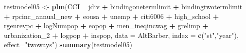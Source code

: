 \documentclass[]{article}
\newenvironment{Shaded}{\begin{snugshade}}{\end{snugshade}}
\newcommand{\KeywordTok}[1]{\textcolor[rgb]{0.13,0.29,0.53}{\textbf{#1}}}
\newcommand{\DataTypeTok}[1]{\textcolor[rgb]{0.13,0.29,0.53}{#1}}
\newcommand{\DecValTok}[1]{\textcolor[rgb]{0.00,0.00,0.81}{#1}}
\newcommand{\StringTok}[1]{\textcolor[rgb]{0.31,0.60,0.02}{#1}}
\newcommand{\OperatorTok}[1]{\textcolor[rgb]{0.81,0.36,0.00}{\textbf{#1}}}
\newcommand{\NormalTok}[1]{#1}
\begin{document}
\begin{Shaded}
\begin{Highlighting}[]
\NormalTok{testmodel05 <-}\StringTok{ }\KeywordTok{plm}\NormalTok{(CCI }\OperatorTok{~}\StringTok{ }\NormalTok{jdiv }\OperatorTok{+}\StringTok{ }\NormalTok{bindingonetermlimit }\OperatorTok{+}\StringTok{ }\NormalTok{bindingtwotermlimit }\OperatorTok{+}\StringTok{ }\NormalTok{rpcinc_annual_new }\OperatorTok{+}\StringTok{ }\NormalTok{eousa }\OperatorTok{+}\StringTok{ }\NormalTok{unemp }\OperatorTok{+}\StringTok{ }\NormalTok{citi6006 }\OperatorTok{+}\StringTok{ }\NormalTok{high_school }\OperatorTok{+}\StringTok{ }\NormalTok{rgenrevpc }\OperatorTok{+}\StringTok{ }\NormalTok{logNumpop }\OperatorTok{+}\StringTok{ }\NormalTok{eopop }\OperatorTok{+}\StringTok{ }\NormalTok{men_ineqincwag }\OperatorTok{+}\StringTok{ }\NormalTok{grelimp }\OperatorTok{+}\StringTok{ }\NormalTok{urbanization_}\DecValTok{2} \OperatorTok{+}\StringTok{ }\NormalTok{logpop }\OperatorTok{+}\StringTok{ }\NormalTok{inspop, }\DataTypeTok{data =}\NormalTok{ AltBarber, }\DataTypeTok{index =} \KeywordTok{c}\NormalTok{(}\StringTok{"st"}\NormalTok{,}\StringTok{"year"}\NormalTok{), }\DataTypeTok{effect=}\StringTok{"twoways"}\NormalTok{)}
\KeywordTok{summary}\NormalTok{(testmodel05)}
\end{Highlighting}
\end{Shaded}
\end{document}
